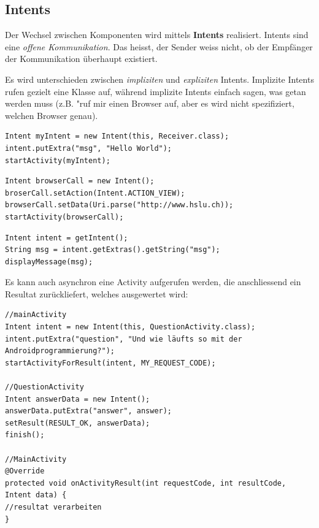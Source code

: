 \documentclass[a4paper, 11pt]{article}
\begin{document}
\subsection{Intents}
Der Wechsel zwischen Komponenten wird mittels \textbf{Intents} realisiert. Intents sind eine \textit{offene Kommunikation}. Das heisst, der Sender weiss nicht, ob der Empfänger der Kommunikation überhaupt existiert. 

Es wird unterschieden zwischen \textit{impliziten} und \textit{expliziten} Intents. Implizite Intents rufen gezielt eine Klasse auf, während implizite Intents einfach sagen, was getan werden muss (z.B. "ruf mir einen Browser auf, aber es wird nicht spezifiziert, welchen Browser genau). \\

\begin{lstlisting}[captionpos=b, caption={Beispiel eines expliziten Intents}]
Intent myIntent = new Intent(this, Receiver.class);
intent.putExtra("msg", "Hello World");
startActivity(myIntent);
\end{lstlisting}

\begin{lstlisting}[captionpos=b, caption={Beispiel eines impliziten Intents}]
Intent browserCall = new Intent();
broserCall.setAction(Intent.ACTION_VIEW);
browserCall.setData(Uri.parse("http://www.hslu.ch));
startActivity(browserCall);
\end{lstlisting}

\begin{lstlisting}[captionpos=b, caption={Empfangen und Auswerten eines Intents}]
Intent intent = getIntent();
String msg = intent.getExtras().getString("msg");
displayMessage(msg);
\end{lstlisting}

Es kann auch asynchron eine Activity aufgerufen werden, die anschliessend ein Resultat zurückliefert, welches ausgewertet wird:

\begin{lstlisting}[captionpos=b, caption={Beispiel eines asynchronen Methodenaufrufs}]
//mainActivity
Intent intent = new Intent(this, QuestionActivity.class);
intent.putExtra("question", "Und wie läufts so mit der Androidprogrammierung?");
startActivityForResult(intent, MY_REQUEST_CODE);

//QuestionActivity
Intent answerData = new Intent();
answerData.putExtra("answer", answer);
setResult(RESULT_OK, answerData);
finish();

//MainActivity
@Override
protected void onActivityResult(int requestCode, int resultCode, Intent data) {
//resultat verarbeiten
}
\end{lstlisting}
\end{document}
